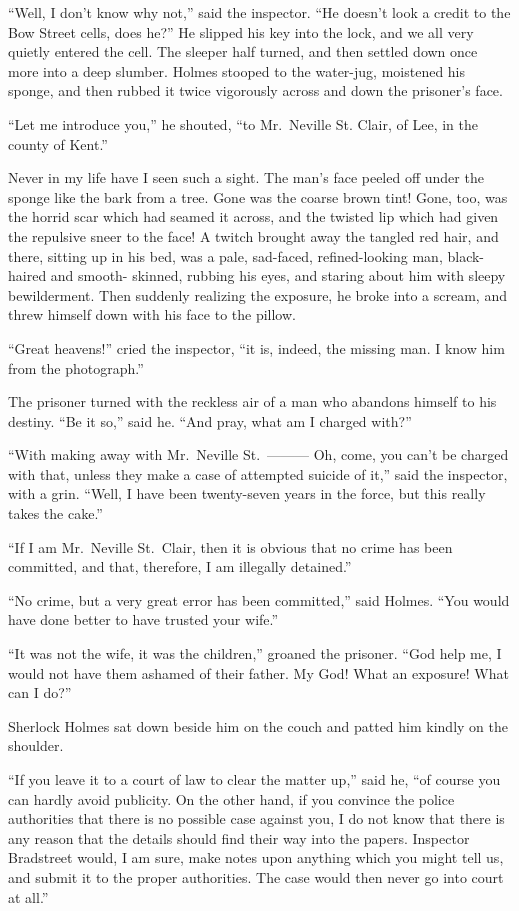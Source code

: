 “Well, I don’t know why not,” said the inspector. “He
doesn’t look a credit to the Bow Street cells, does he?” He
slipped his key into the lock, and we all very quietly entered
the cell. The sleeper half turned, and then settled down once
more into a deep slumber. Holmes stooped to the water-jug,
moistened his sponge, and then rubbed it twice vigorously
across and down the prisoner’s face.

“Let me introduce you,” he shouted, “to Mr.~Nev\-ille St.
Clair, of Lee, in the county of Kent.”

Never in my life have I seen such a sight. The man’s face
peeled off under the sponge like the bark from a tree. Gone
was the coarse brown tint! Gone, too, was the horrid scar
which had seamed it across, and the twisted lip which had
given the repulsive sneer to the face! A twitch brought away
the tangled red hair, and there, sitting up in his bed, was a
pale, sad-faced, refined-looking man, black-haired and smooth-%
skinned, rubbing his eyes, and staring about him with sleepy
bewilderment. Then suddenly realizing the exposure, he broke
into a scream, and threw himself down with his face to the
pillow.

“Great heavens!” cried the inspector, “it is, indeed, the
missing man. I know him from the photograph.”

The prisoner turned with the reckless air of a man who
abandons himself to his destiny. “Be it so,” said he. “And
pray, what am I charged with?”

“With making away with Mr.~Neville St.~--------- Oh, come,
you can’t be charged with that, unless they make a case of
attempted suicide of it,” said the inspector, with a grin.
“Well, I have been twenty-seven years in the force, but this
really takes the cake.”

“If I am Mr.~Neville St.~Clair, then it is obvious that no
crime has been committed, and that, therefore, I am illegally
detained.”

“No crime, but a very great error has been committed,”
said Holmes. “You would have done better to have trusted
your wife.”

“It was not the wife, it was the children,” groaned the prisoner.
“God help me, I would not have them ashamed of
their father. My God! What an exposure! What can I
do?”

Sherlock Holmes sat down beside him on the couch and
patted him kindly on the shoulder.

“If you leave it to a court of law to clear the matter up,”
said he, “of course you can hardly avoid publicity. On the
other hand, if you convince the police authorities that there is
no possible case against you, I do not know that there is any
reason that the details should find their way into the papers.
Inspector Bradstreet would, I am sure, make notes upon anything
which you might tell us, and submit it to the proper authorities.
The case would then never go into court at all.”


